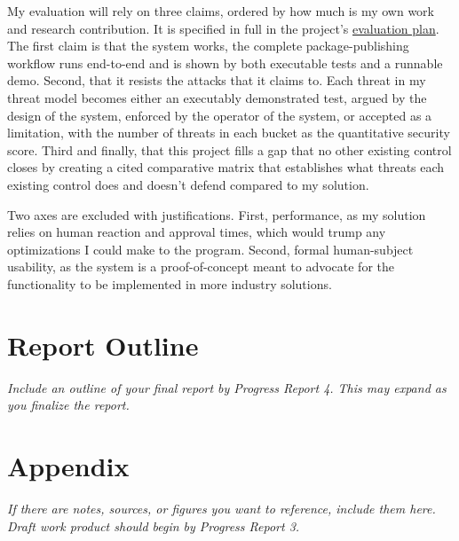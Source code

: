 \documentclass[12pt]{article}
\newcommand{\PRNumber}{3}
\newcommand{\RepoURL}{https://github.com/Ian-Costa18/Cybersecurity-Practicum/blob/progress-report-\PRNumber}
\newcommand{\instruction}[1]{{\small\itshape #1}}
\begin{document}
My evaluation will rely on three claims, ordered by how much is my own work and research contribution. It is specified in full in the project's \href{\RepoURL/docs/evaluation-plan.md}{evaluation plan}. The first claim is that the system works, the complete package-publishing workflow runs end-to-end and is shown by both executable tests and a runnable demo. Second, that it resists the attacks that it claims to. Each threat in my threat model becomes either an executably demonstrated test, argued by the design of the system, enforced by the operator of the system, or accepted as a limitation, with the number of threats in each bucket as the quantitative security score. Third and finally, that this project fills a gap that no other existing control closes by creating a cited comparative matrix that establishes what threats each existing control does and doesn't defend compared to my solution.

Two axes are excluded with justifications. First, performance, as my solution relies on human reaction and approval times, which would trump any optimizations I could make to the program. Second, formal human-subject usability, as the system is a proof-of-concept meant to advocate for the functionality to be implemented in more industry solutions.

\section*{Report Outline}

\instruction{Include an outline of your final report by Progress Report 4. This may expand as you finalize the report.}




\newpage
\section*{Appendix}

\instruction{If there are notes, sources, or figures you want to reference, include them here. Draft work product should begin by Progress Report 3.}
\end{document}
